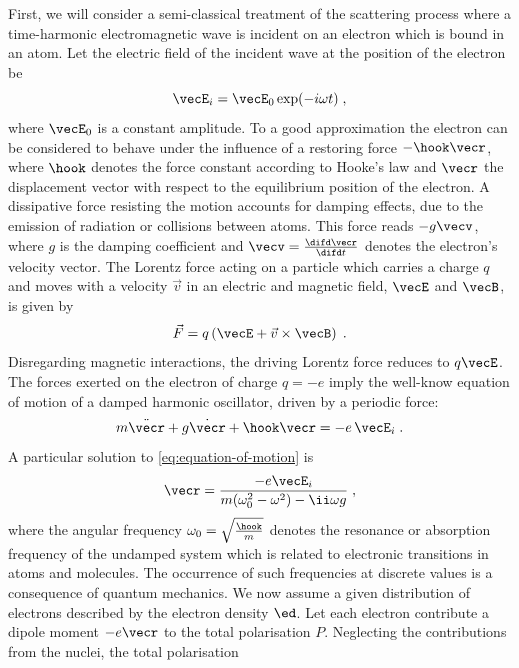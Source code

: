 \documentclass[
twoside,
openright,
titlepage,
numbers=noenddot,
headinclude,
fleqn,
a4paper,
footinclude=true,
cleardoublepage=empty,
abstractoff,
BCOR=5mm,
paper=a4,
fontsize=11pt,
british,ngerman,american,
]{scrreprt}
\begin{document}
First, we will consider a semi-classical treatment of the scattering
process where a time-harmonic electromagnetic wave is incident on an
electron which is bound in an atom.  Let the electric field of the
incident wave at the position of the electron be
\begin{equation}
  \label{eq:incident-electric-field}
     \vecE_i=\vecE_0\exp(-i\omega t) \;,
\end{equation}
where $\vecE_0$ is a constant amplitude.  To a good approximation the
electron can be considered to behave under the influence of a
restoring force $-\hook\vecr$, where $\hook$ denotes the force
constant according to Hooke's law and $\vecr$ the displacement vector
with respect to the equilibrium position of the electron.  A
dissipative force resisting the motion accounts for damping effects,
\eg{} due to the emission of radiation or collisions between atoms.
This force reads $-g\vecv$, where $g$ is the damping coefficient and
$\vecv=\frac{\difd\vecr}{\difd t}$ denotes the electron's velocity
vector.  The Lorentz force acting on a particle which carries a charge
$q$ and moves with a velocity $\vec{v}$ in an electric and
magnetic field, $\vecE$ and $\vecB$, is given by
\begin{equation}
  \label{eq:lorentz}
  \vec{F} = q\left(\vecE + \vec{v}\times \vecB\right) \;.
\end{equation}
Disregarding magnetic interactions, the driving Lorentz force reduces
to $q\vecE$.  The forces exerted on the electron of charge $q=-e$
imply the well-know equation of motion of a damped harmonic
oscillator, driven by a periodic force:
\begin{equation}
  \label{eq:equation-of-motion}
  m\ddot{\vecr}+g\dot{\vecr}+\hook\vecr = -e\,\vecE_i\;.
\end{equation}
A particular solution to \cref{eq:equation-of-motion} is
\begin{equation}
  \label{eq:particular-solution}
  \vecr = \frac{-e\vecE_i}{m(\omega_0^2-\omega^2)-\ii\omega g}\;,
\end{equation}
where the angular frequency $\omega_0=\sqrt{\frac{\hook}{m}}$ denotes
the resonance or absorption frequency of the undamped system which is
related to electronic transitions in atoms and molecules.  The
occurrence of such frequencies at discrete values is a consequence of
quantum mechanics.  We now assume a given distribution of electrons
described by the electron density $\ed$.  Let each electron contribute
a dipole moment  $-e\vecr$ to the total polarisation $P$.
Neglecting the contributions from the nuclei, the total polarisation
\end{document}
